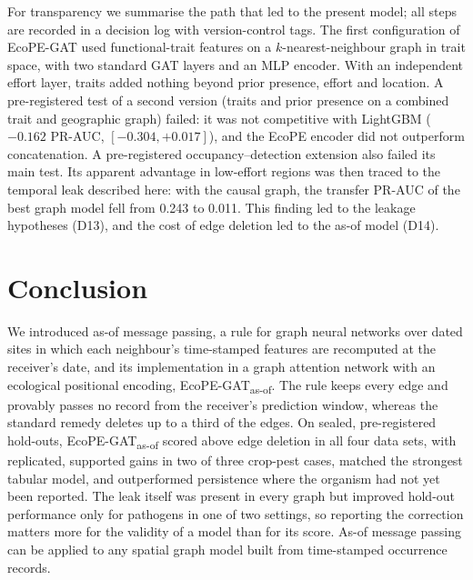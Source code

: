 \documentclass[a4paper,fleqn]{cas-sc}
\newcommand{\Masof}{\mbox{EcoPE-GAT\textsubscript{as-of}}}
\begin{document}
For transparency we summarise the path that led to the present model; all steps are recorded in a decision log with version-control tags. The first configuration of EcoPE-GAT used functional-trait features on a $k$-nearest-neighbour graph in trait space, with two standard GAT layers and an MLP encoder. With an independent effort layer, traits added nothing beyond prior presence, effort and location. A pre-registered test of a second version (traits and prior presence on a combined trait and geographic graph) failed: it was not competitive with LightGBM ($-0.162$ PR-AUC, $[-0.304, +0.017]$), and the EcoPE encoder did not outperform concatenation. A pre-registered occupancy--detection extension also failed its main test. Its apparent advantage in low-effort regions was then traced to the temporal leak described here: with the causal graph, the transfer PR-AUC of the best graph model fell from 0.243 to 0.011. This finding led to the leakage hypotheses (D13), and the cost of edge deletion led to the as-of model (D14).

\section{Conclusion}
\label{sec:conclusion}

We introduced as-of message passing, a rule for graph neural networks over dated sites in which each neighbour's time-stamped features are recomputed at the receiver's date, and its implementation in a graph attention network with an ecological positional encoding, \Masof. The rule keeps every edge and provably passes no record from the receiver's prediction window, whereas the standard remedy deletes up to a third of the edges. On sealed, pre-registered hold-outs, \Masof{} scored above edge deletion in all four data sets, with replicated, supported gains in two of three crop-pest cases, matched the strongest tabular model, and outperformed persistence where the organism had not yet been reported. The leak itself was present in every graph but improved hold-out performance only for pathogens in one of two settings, so reporting the correction matters more for the validity of a model than for its score. As-of message passing can be applied to any spatial graph model built from time-stamped occurrence records.

\end{document}
